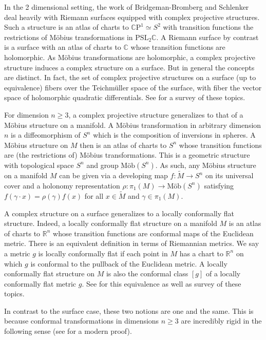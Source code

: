 \documentclass{amsart}
\newcommand{\R}{\mathbb{R}}
\newcommand{\C}{\mathbb{C}}
\newcommand{\CP}{\mathbb{C}\mathrm{P}}
\numberwithin{equation}{section}
\begin{document}
In the 2 dimensional setting, the work of Bridgeman-Bromberg \cite{Bridgeman-Bromberg2022} and Schlenker \cite{Schlenker2017} deal heavily with Riemann surfaces equipped with complex projective structures.
Such a structure is an atlas of charts to $\CP^1 \simeq S^2$ with transition functions the restrictions of M\"obius transformations in $\mathrm{PSL}_2\C$.
A Riemann surface by contrast is a surface with an atlas of charts to $\C$ whose transition functions are holomorphic. 
As M\"obius transformations are holomorphic, a complex projective structure induces a complex structure on a surface.
But in general the concepts are distinct. 
In fact, the set of complex projective structures on a surface (up to equivalence) fibers over the Teichm\"uller space of the surface, with fiber the vector space of holomorphic quadratic differentials.
See \cite{Dumas2009} for a survey of these topics. 

For dimension $n \geq 3$, a complex projective structure generalizes to that of a M\"obius structure on a manifold.
A M\"obius transformation in arbitrary dimension $n$ is a diffeomorphism of $S^n$ which is the composition of inversions in spheres. 
A M\"obius structure on $M$ then is an atlas of charts to $S^n$ whose transition functions are (the restrictions of) M\"obius transformations.
This is a geometric structure with topological space $S^n$ and group $\text{M\"ob}(S^n)$. 
As such, any M\"obius structure on a manifold $M$ can be given via a developing map $f: \tilde{M} \to S^n$ on its universal cover and a holonomy representation $\rho: \pi_1(M) \to \text{M\"ob}(S^n)$ satisfying $f(\gamma \cdot x) = \rho(\gamma)f(x)$ for all $x \in \tilde{M}$ and $\gamma \in \pi_1(M)$.

A complex structure on a surface generalizes to a locally conformally flat structure.
Indeed, a locally conformally flat structure on a manifold $M$ is an atlas of charts to $\R^n$ whose transition functions are conformal maps of the Euclidean metric.
There is an equivalent definition in terms of Riemannian metrics.
We say a metric $g$ is locally conformally flat if each point in $M$ has a chart to $\R^n$ on which $g$ is conformal to the pullback of the Euclidean metric.
A locally conformally flat structure on $M$ is also the conformal class $[g]$ of a locally conformally flat metric $g$.
See \cite{Matsumoto1992} for this equivalence as well as survey of these topics.


In contrast to the surface case, these two notions are one and the same.
This is because conformal transformations in dimensions $n \geq 3$ are incredibly rigid in the following sense (see \cite{Matsumoto1992} for a modern proof).
\end{document}
